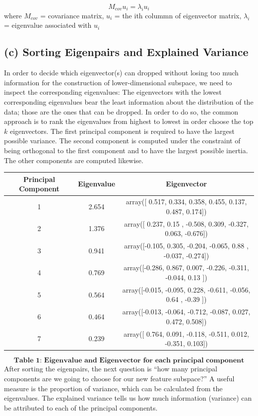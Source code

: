 \documentclass[12pt,twoside]{article}
\newcommand{\head}[1]{\textnormal{\textbf{#1}}}
\begin{document}
$$M_{cov} u_i = \lambda_i u_i$$ where
\newline$M_{cov}$ = covariance matrix, 
\newline$u_i$ = the ith colummn of eigenvector matrix, 
\newline$\lambda_i$ = eigenvalue associated with $u_i$

\subsection*{(c) Sorting Eigenpairs and Explained Variance}

In order to decide which eigenvector(s) can dropped without losing too much information for the construction of lower-dimensional subspace, we need to inspect the corresponding eigenvalues: The eigenvectors with the lowest corresponding eigenvalues bear the least information about the distribution of the data; those are the ones that can be dropped. In order to do so, the common approach is to rank the eigenvalues from highest to lowest in order choose the top $k$ eigenvectors. The first principal component is required to have the largest possible variance. The second component is computed under the constraint of being orthogonal to the first component and to have the largest possible inertia. The other components are computed likewise.
\bigbreak
\begin{tabular}{ccc}
\hline
\head{Principal Component} & \head{Eigenvalue} & \head{Eigenvector}\\
\hline
1  & 2.654 & array([ 0.517,  0.334,  0.358,  0.455,  0.137,  0.487,  0.174])\\
2 & 1.376 &  array([ 0.237,  0.15 , -0.508,  0.309, -0.327,  0.063, -0.676])\\
3 & 0.941 & array([-0.105,  0.305, -0.204, -0.065,  0.88 , -0.037, -0.274])\\
4 & 0.769 & array([-0.286,  0.867,  0.007, -0.226, -0.311, -0.044,  0.13 ])\\
5 & 0.564 & array([-0.015, -0.095,  0.228, -0.611, -0.056,  0.64 , -0.39 ])\\
6 & 0.464 & array([-0.013, -0.064, -0.712, -0.087,  0.027,  0.472,  0.508])\\
7 & 0.239 & array([ 0.764,  0.091, -0.118, -0.511,  0.012, -0.351,  0.103])\\
\hline
\end{tabular}
$$\textbf{Table 1:  Eigenvalue and Eigenvector for each principal component}$$
\bigbreak
After sorting the eigenpairs, the next question is “how many principal components are we going to choose for our new feature subspace?” A useful measure is the proportion of variance, which can be calculated from the eigenvalues. The explained variance tells us how much information (variance) can be attributed to each of the principal components.
\end{document}
